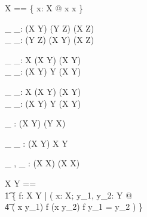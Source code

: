 \documentclass[11pt,a4paper]{article}
\begin{document}

\begin{zed}
\id X == \{ x: X @ x \mapsto x \}
\end{zed}

\begin{gendef}[X, Y, Z]
	\_ \comp \_: (X \rel Y) \cross (Y \rel Z) \fun (X \rel Z) \\
	\_ \circ \_: (Y \rel Z) \cross (X \rel Y) \fun (X \rel Z) \\
\end{gendef}


\begin{gendef}[X, Y]
	\_ \dres \_: \power X \cross (X \rel Y) \fun (X \rel Y) \\
	\_ \rres \_: (X \rel Y) \cross \power Y \fun (X \rel Y) \\
\end{gendef}


\begin{gendef}[X, Y]
	\_ \ndres \_: \power X \cross (X \rel Y) \fun (X \rel Y) \\
	\_ \nrres \_: (X \rel Y) \cross \power Y \fun (X \rel Y) \\
\end{gendef}


\begin{gendef}[X, Y]
	\_ \inv : (X \rel Y) \fun (Y \rel X)
\end{gendef}


\begin{gendef}[X, Y]
	\_ \limg \_ \rimg : (X \rel Y) \cross \power X \fun \power Y
\end{gendef}


\begin{gendef}[X]
	\_ \plus, \_ \star : (X \rel X) \fun (X \rel X)
\end{gendef}


\begin{zed}
	X \pfun Y == \\
	\t1	\{ f: X \rel Y | ( \forall x: X; y_1, y_2: Y @ \\
	\t4	( x \mapsto y_1) \in f \land (x \mapsto y_2) \in f \implies
								y_1 = y_2 ) \}
\end{zed}
\end{document}
